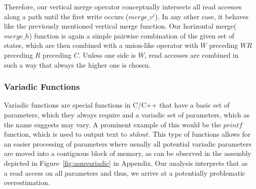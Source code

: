 Therefore, our vertical merge operator conceptually intersects all read accesses along a path until the first write 
occurs ($merge\_v^{i}$). In any other case, it behaves like the previously mentioned vertical merge function.
Our horizontal merge($merge\_h$) function is again a simple pairwise combination of the given set of states, which are then combined with a union-like operator 
with $W$ preceding $WR$ preceding $R$ preceding $C$. Unless one side is $W$, read accesses are combined in such a way that always the higher one is chosen.

%

\subsubsection{Variadic Functions}
\label{subsection:variadicfunctions}
Variadic functions are special functions in C/C++ that have a basic set of parameters, 
which they always require and a variadic set of parameters, which as the name suggests 
may vary. A prominent example of this would be the $printf$ function, which is used 
to output text to $stdout$.
This type of functions allows for an easier processing of parameters where
usually all potential variadic parameters are moved into a contiguous block of memory, 
as can be observed in the assembly depicted in Figure~\ref{fig:asmvariadic} in Appendix.
Our analysis interprets that as a read access on all parameters and thus,
we arrive at a potentially problematic overestimation. 

